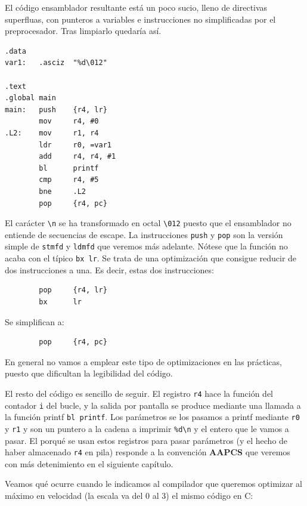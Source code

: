 El código ensamblador resultante está un poco sucio, lleno de directivas superfluas,
con punteros a variables e instrucciones no simplificadas por el preprocesador. Tras
limpiarlo quedaría así.

\begin{lstlisting}[caption={Código del programa tipos3a.s},label={lst:codigoPract2_6}]
.data
var1:   .asciz  "%d\012"

.text
.global main
main:   push    {r4, lr}
        mov     r4, #0
.L2:    mov     r1, r4
        ldr     r0, =var1
        add     r4, r4, #1
        bl      printf
        cmp     r4, #5
        bne     .L2
        pop     {r4, pc}
\end{lstlisting}

El carácter {\tt \textbackslash n} se ha transformado en octal {\tt \textbackslash 012} puesto que el ensamblador
no entiende de secuencias de escape. La instrucciones {\tt push} y {\tt pop} son la versión
simple de {\tt stmfd} y {\tt ldmfd} que veremos más adelante. Nótese que la función no acaba
con el típico {\tt bx lr}. Se trata de una optimización que consigue reducir de dos
instrucciones a una. Es decir, estas dos instrucciones:

\begin{lstlisting}
        pop     {r4, lr}
        bx      lr
\end{lstlisting}

Se simplifican a:

\begin{lstlisting}
        pop     {r4, pc}
\end{lstlisting}

En general no vamos a emplear este tipo de optimizaciones en las prácticas, puesto que
dificultan la legibilidad del código.

El resto del código es sencillo de seguir. El registro {\tt r4} hace la función del
contador {\tt i} del bucle, y la salida por pantalla se produce mediante una llamada
a la función printf {\tt bl printf}. Los parámetros se los pasamos a printf mediante
{\tt r0} y {\tt r1} y son un puntero a la cadena a imprimir {\tt \%d\textbackslash n}
y el entero que le vamos a pasar. El porqué se usan estos registros para pasar
parámetros (y el hecho de
haber almacenado {\tt r4} en pila) responde a la convención {\bf AAPCS} que
veremos con más detenimiento en el siguiente capítulo.

Veamos qué ocurre cuando le indicamos al compilador que queremos optimizar al
máximo en velocidad (la escala va del 0 al 3) el mismo código en C:

